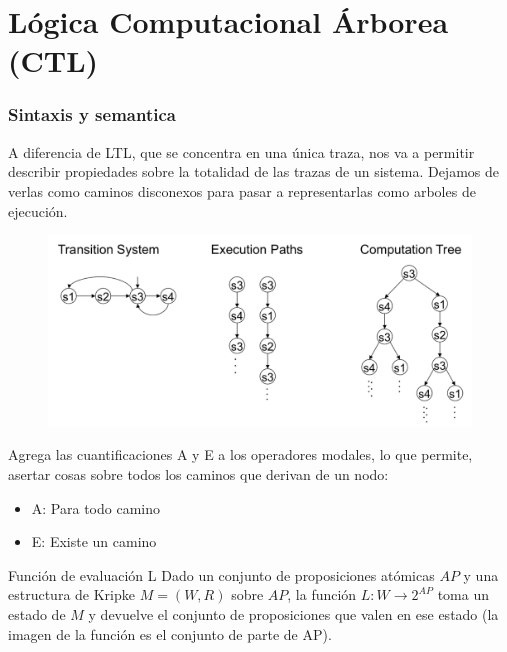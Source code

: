 \newpage
\part{Lógica Computacional Árborea (CTL)}
\section{Sintaxis y semantica}
A diferencia de LTL, que se concentra en una única traza, nos va a permitir describir propiedades sobre la totalidad de las trazas de un sistema. Dejamos de verlas como caminos disconexos para pasar a representarlas como arboles de ejecución.

\begin{figure}[h]
\centering
	\includegraphics[scale=0.25]{imagenes/ctl-ltl-comparison}
\end{figure}

Agrega las cuantificaciones A y E a los operadores modales, lo que permite, asertar cosas sobre todos los caminos que derivan de un nodo:
\begin{itemize}
\item A: Para todo camino
\item E: Existe un camino
\end{itemize}

\begin{definicion}{Función de evaluación L}
Dado un conjunto de proposiciones atómicas $AP$ y una estructura de Kripke $M=(W,R)$ sobre $AP$, la función $L:W\to 2^{AP}$ toma un estado de $M$ y devuelve el conjunto de proposiciones que valen en ese estado (la imagen de la función es el conjunto de parte de AP).
\end{definicion}
